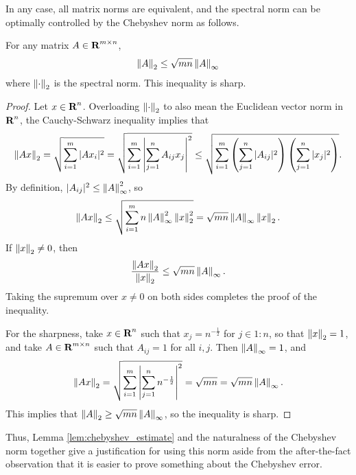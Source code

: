 \documentclass{article}
\begin{document}
	In any case, all matrix norms are equivalent, and the spectral norm can be optimally controlled by the Chebyshev norm as follows.
	
	\begin{lem}
		\label{lem:chebyshev_estimate}
		For any matrix $A \in \textnormal{\bf R}^{m\times n}$,
		\begin{equation}
			\left\lVert A \right\rVert_2 \le \sqrt{mn}\left\lVert A \right\rVert_\infty
		\end{equation}
		where $\left\lVert \cdot \right\rVert_2$ is the spectral norm. This inequality is sharp.
	\end{lem}
	
	\begin{proof}
		Let $x \in \textnormal{\bf R}^n$. Overloading $\left\lVert \cdot \right\rVert_2$ to also mean the Euclidean vector norm in $\textnormal{\bf R}^n$, the Cauchy-Schwarz inequality implies that
		\begin{equation}
			\left\lVert Ax \right\rVert_2 = \sqrt{\sum_{i=1}^m|Ax_i|^2} = \sqrt{\sum_{i=1}^m\left|\sum_{j=1}^nA_{ij}x_j\right|^2} \le \sqrt{\sum_{i=1}^m\left(\sum_{j=1}^n|A_{ij}|^2\right)\left(\sum_{j=1}^n|x_j|^2\right)}.
		\end{equation}
		By definition, $|A_{ij}|^2 \le \left\lVert A \right\rVert_\infty^2$, so
		\begin{equation}
			\left\lVert Ax \right\rVert_2 \le \sqrt{\sum_{i=1}^m n\left\lVert A \right\rVert_\infty^2\left\lVert x \right\rVert_2^2} = \sqrt{mn}\left\lVert A \right\rVert_\infty\left\lVert x \right\rVert_2.
		\end{equation}
		If $\left\lVert x \right\rVert_2 \ne 0$, then
		\begin{equation}
			\frac{\left\lVert Ax \right\rVert_2}{\left\lVert x \right\rVert_2} \le \sqrt{mn}\left\lVert A \right\rVert_\infty.
		\end{equation}
		Taking the supremum over $x \ne 0$ on both sides completes the proof of the inequality.
		
		For the sharpness, take $x\in \textnormal{\bf R}^n$ such that $x_j = n^{-\frac{1}{2}}$ for $j \in 1:n$, so that $\left\lVert x \right\rVert_2 = 1$, and take $A \in \textnormal{\bf R}^{m\times n}$ such that $A_{ij} = 1$ for all $i,j$. Then $\left\lVert A \right\rVert_\infty = 1$, and
		\begin{equation}
			\left\lVert Ax \right\rVert_2 = \sqrt{\sum_{i=1}^m\left|\sum_{j=1}^nn^{-\frac{1}{2}}\right|^2} = \sqrt{mn} =  \sqrt{mn} \left\lVert A \right\rVert_\infty.
		\end{equation}
		This implies that $\left\lVert A \right\rVert_2 \ge \sqrt{mn}\left\lVert A \right\rVert_\infty$, so the inequality is sharp.
	\end{proof}
	
	Thus, Lemma \ref{lem:chebyshev_estimate} and the naturalness of the Chebyshev norm together give a justification for using this norm aside from the after-the-fact observation that it is easier to prove something about the Chebyshev error.
	
\end{document}

